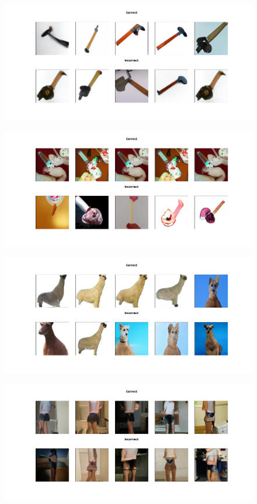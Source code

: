 \documentclass[12pt,a4paper,openany]{book}
\begin{document}
\begin{figure}[ht!]
    \centering
    \includegraphics[scale=0.4]{figs/imagenet_examples/hammer.png}
\end{figure}
\begin{figure}[ht!]
    \centering
    \includegraphics[scale=0.4]{figs/imagenet_examples/ice cream.png}
\end{figure}
\begin{figure}[ht!]
    \centering
    \includegraphics[scale=0.4]{figs/imagenet_examples/llama.png}
\end{figure}
\begin{figure}[ht!]
    \centering
    \includegraphics[scale=0.4]{figs/imagenet_examples/miniskirt.png}
\end{figure}
\end{document}
